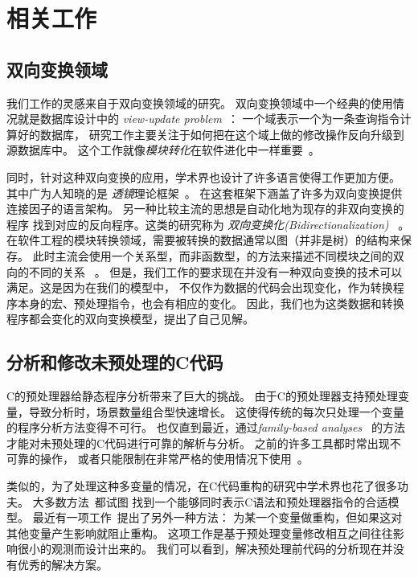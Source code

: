 \chapter{相关工作}
\label{sec:related}

\section{双向变换领域}
我们工作的灵感来自于双向变换领域的研究。
双向变换领域中一个经典的使用情况就是数据库设计中的
\emph{view-update problem}~\parencite{BaSp81,DaBe82,Hegner90,Cui2000,Fegaras2010}：
一个域表示一个为一条查询指令计算好的数据库，
研究工作主要关注于如何把在这个域上做的修改操作反向升级到源数据库中。
这个工作就像\emph{模块转化}在软件进化中一样重要~\parencite{YuLHHKM12,XiLHZTM07}。

同时，针对这种双向变换的应用，学术界也设计了许多语言使得工作更加方便。
其中广为人知晓的是 \emph{透镜}理论框架~\parencite{HuMT04,MuHT04aplas,Foster:2007,BoFPPS08,FoPP08,WaGMH10,Diskin2011,Hofmann2012,FoMV12,RaLFC13}。
在这套框架下涵盖了许多为双向变换提供连接因子的语言架构。
另一种比较主流的思想是自动化地为现存的非双向变换的程序
找到对应的反向程序。这类的研究称为 \emph{双向变换化(Bidirectionalization)}
~\parencite{MaHNHT07,Voigtlander09bff,voigtlander2010combining,WaGW11,VoHMW13,WaGMH13,MaWa13,MaWa13ppdp,WaNa14,MaWa14}。
在软件工程的模块转换领域，需要被转换的数据通常以图（并非是树）的结构来保存。
此时主流会使用一个关系型，而非函数型，的方法来描述不同模块之间的双向的不同的关系
~\parencite{qvt,Stevens2010,Schurr1994,Schurr2008,HiHIKMN10,Hidaka:2011}。
但是，我们工作的要求现在并没有一种双向变换的技术可以满足。这是因为在我们的模型中，
不仅作为数据的代码会出现变化，作为转换程序本身的宏、预处理指令，也会有相应的变化。
因此，我们也为这类数据和转换程序都会变化的双向变换模型，提出了自己见解。


\section{分析和修改未预处理的C代码}
C的预处理器给静态程序分析带来了巨大的挑战。
由于C的预处理器支持预处理变量，导致分析时，场景数量组合型快速增长。
这使得传统的每次只处理一个变量的程序分析方法变得不可行。
也仅直到最近，通过\emph{family-based
analyses}~\parencite{Kastner2011,Gazzillo2012,Liebig2013}
的方法才能对未预处理的C代码进行可靠的解析与分析。
之前的许多工具都时常出现不可靠的操作，
或者只能限制在非常严格的使用情况下使用~\parencite{Baxter2001,Garrido2005,Padioleau2009}。

类似的，为了处理这种多变量的情况，在C代码重构的研究中学术界也花了很多功夫。
大多数方法~\parencite{Garrido2002,Vittek2003,Spinellis2003,Garrido2013}都试图
找到一个能够同时表示C语法和预处理器指令的合适模型。
最近有一项工作~\parencite{Overbey2014}提出了另外一种方法：
为某一个变量做重构，但如果这对其他变量产生影响就阻止重构。
这项工作是基于预处理变量修改相互之间往往影响很小的观测而设计出来的。
我们可以看到，解决预处理前代码的分析现在并没有优秀的解决方案。

